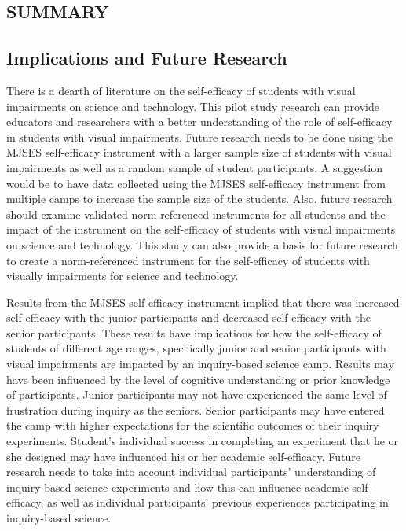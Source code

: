\documentclass[11.5pt]{sig-alternate} %
\begin{document}
\begin{large}
\section*{SUMMARY}

\subsection*{Implications and Future Research}
	
There is a dearth of literature on the self-efficacy of students with visual impairments on science and technology. This pilot study research can provide educators and researchers with a better understanding of the role of self-efficacy in students with visual impairments. Future research needs to be done using the MJSES self-efficacy instrument with a larger sample size of students with visual impairments as well as a random sample of student participants. A suggestion would be to have data collected using the MJSES self-efficacy instrument from multiple camps to increase the sample size of the students. Also, future research should examine validated norm-referenced instruments for all students and the impact of the instrument on the self-efficacy of students with visual impairments on science and technology. This study can also provide a basis for future research to create a norm-referenced instrument for the self-efficacy of students with visually impairments for science and technology. 

Results from the MJSES self-efficacy instrument implied that there was increased self-efficacy with the junior participants and decreased self-efficacy with the senior participants.  These results have implications for how the self-efficacy of students of different age ranges, specifically junior and senior participants with visual impairments are impacted by an inquiry-based science camp. Results may have been influenced by the level of cognitive understanding or prior knowledge of participants. Junior participants may not have experienced the same level of frustration during inquiry as the seniors. Senior participants may have entered the camp with higher expectations for the scientific outcomes of their inquiry experiments. Student’s individual success in completing an experiment that he or she designed may have influenced his or her academic self-efficacy. Future research needs to take into account individual participants’ understanding of inquiry-based science experiments and how this can influence academic self-efficacy, as well as individual participants’ previous experiences participating in inquiry-based science.


\end{large}
\end{document}
